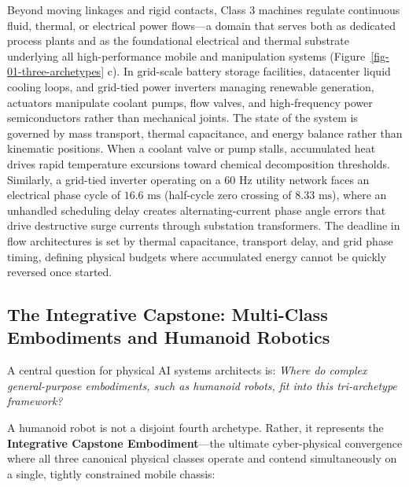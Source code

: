 \documentclass[
  10pt,
  letterpaper,
  twoside,
  openright,
  numbers=noenddot,
  headings=standardclasses
]{scrbook}
\begin{document}
Beyond moving linkages and rigid contacts, Class 3 machines regulate
continuous fluid, thermal, or electrical power flows---a domain that
serves both as dedicated process plants and as the foundational
electrical and thermal substrate underlying all high-performance mobile
and manipulation systems (Figure~\ref{fig-01-three-archetypes} c). In
grid-scale battery storage facilities, datacenter liquid cooling loops,
and grid-tied power inverters managing renewable generation, actuators
manipulate coolant pumps, flow valves, and high-frequency power
semiconductors rather than mechanical joints. The state of the system is
governed by mass transport, thermal capacitance, and energy balance
rather than kinematic positions. When a coolant valve or pump stalls,
accumulated heat drives rapid temperature excursions toward chemical
decomposition thresholds. Similarly, a grid-tied inverter operating on a
\(60\text{ Hz}\) utility network faces an electrical phase cycle of
\(16.6\text{ ms}\) (half-cycle zero crossing of \(8.33\text{ ms}\)),
where an unhandled scheduling delay creates alternating-current phase
angle errors that drive destructive surge currents through substation
transformers. The deadline in flow architectures is set by thermal
capacitance, transport delay, and grid phase timing, defining physical
budgets where accumulated energy cannot be quickly reversed once
started.

\subsection{The Integrative Capstone: Multi-Class Embodiments and
Humanoid
Robotics}\label{the-integrative-capstone-multi-class-embodiments-and-humanoid-robotics}

A central question for physical AI systems architects is: \emph{Where do
complex general-purpose embodiments, such as humanoid robots, fit into
this tri-archetype framework?}

A humanoid robot is not a disjoint fourth archetype. Rather, it
represents the \textbf{Integrative Capstone Embodiment}---the ultimate
cyber-physical convergence where all three canonical physical classes
operate and contend simultaneously on a single, tightly constrained
mobile chassis:
\end{document}
